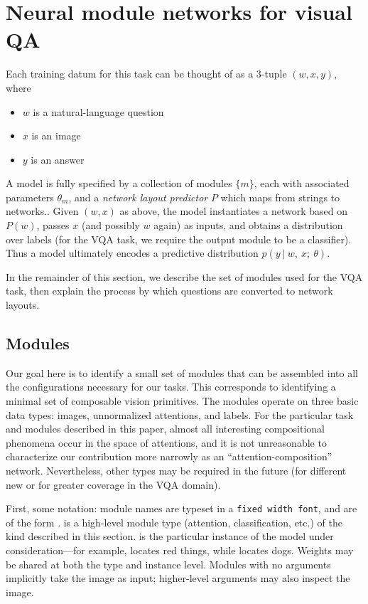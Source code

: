 
\section{Neural module networks for visual QA}
\label{sec:model}

Each training datum for this task can be thought of as a 3-tuple $(w, x, y)$, where
\begin{itemize}
  \setlength\itemsep{0em}
  \item $w$ is a natural-language question
  \item $x$ is an image
  \item $y$ is an answer
\end{itemize}
A model is fully specified by a collection of modules $\{ m \}$, each with
associated parameters $\theta_m$, and a \emph{network layout predictor} $P$
which maps from strings to networks.. Given $(w, x)$ as above, the model
instantiates a network based on $P(w)$, passes $x$ (and possibly $w$ again) as
inputs, and obtains a distribution over labels (for the VQA task, we require the
output module to be a classifier). Thus a model ultimately encodes a predictive
distribution $p(y\ |\ w,\ x;\ \theta)$.

In the remainder of this section, we describe the set of modules used for the
VQA task, then explain the process by which questions are converted to network
layouts.

\subsection{Modules}

Our goal here is to identify a small set of modules that can be assembled into
all the configurations necessary for our tasks. This corresponds to identifying
a minimal set of composable vision primitives. The modules operate on three
basic data types: images, unnormalized attentions, and labels.  For the
particular task and modules described in this paper, almost all interesting
compositional phenomena occur in the space of attentions, and it is not
unreasonable to characterize our contribution more narrowly as an
``attention-composition'' network. Nevertheless, other types may be required in
the future (for different new or for greater coverage in the VQA domain).

First, some notation: module names are typeset in a {\tt fixed width font}, and
are of the form .  is a
high-level module type (attention, classification, etc.) of the kind described
in this section.  is the particular instance of the model under
consideration---for example,  locates red things, while
 locates dogs. Weights may be shared at both the type and
instance level. Modules with no arguments implicitly take the image as input;
higher-level arguments may also inspect the image.

